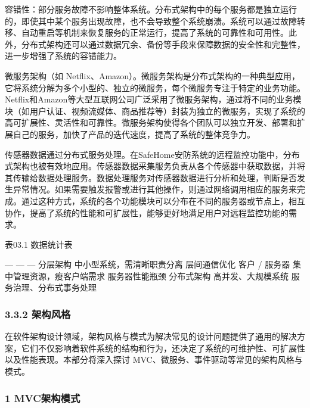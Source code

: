 容错性：部分服务故障不影响整体系统。分布式架构中的每个服务都是独立运行的，即使其中某个服务出现故障，也不会导致整个系统崩溃。系统可以通过故障转移、自动重启等机制来恢复服务的正常运行，提高了系统的可靠性和可用性。此外，分布式架构还可以通过数据冗余、备份等手段来保障数据的安全性和完整性，进一步增强了系统的容错能力。


微服务架构（如 Netflix、Amazon）。微服务架构是分布式架构的一种典型应用，它将系统分解为多个小型的、独立的微服务，每个微服务专注于特定的业务功能。Netflix和Amazon等大型互联网公司广泛采用了微服务架构，通过将不同的业务模块（如用户认证、视频流媒体、商品推荐等）封装为独立的微服务，实现了系统的高可扩展性、灵活性和可靠性。微服务架构使得各个团队可以独立开发、部署和扩展自己的服务，加快了产品的迭代速度，提高了系统的整体竞争力。

传感器数据通过分布式服务处理。在SafeHome安防系统的远程监控功能中，分布式架构也被有效地应用。传感器数据采集服务负责从各个传感器中获取数据，并将其传输给数据处理服务。数据处理服务对传感器数据进行分析和处理，判断是否发生异常情况。如果需要触发报警或进行其他操作，则通过网络调用相应的服务来完成。通过这种方式，系统的各个功能模块可以分布在不同的服务器或节点上，相互协作，提高了系统的性能和可扩展性，能够更好地满足用户对远程监控功能的需求。


表03.1 数据统计表

\textbar---\textbar{} --- \textbar---\textbar{} \textbar{}\textbar{}  \textbar{}\textbar{} \textbar 分层架构\textbar{} 中小型系统，需清晰职责分离 \textbar 层间通信优化\textbar{} \textbar 客户 / 服务器\textbar{} 集中管理资源，瘦客户端需求 \textbar 服务器性能瓶颈\textbar{} \textbar 分布式架构\textbar{} 高并发、大规模系统 \textbar 服务治理、分布式事务处理\textbar{}

\hypertarget{ux67b6ux6784ux98ceux683c}{%
\subsubsection{3.3.2 架构风格}\label{ux67b6ux6784ux98ceux683c}}

在软件架构设计领域，架构风格与模式为解决常见的设计问题提供了通用的解决方案，它们不仅影响着软件系统的结构和行为，还决定了系统的可维护性、可扩展性以及性能表现。本部分将深入探讨 MVC、微服务、事件驱动等常见的架构风格与模式。

\hypertarget{mvcux67b6ux6784ux6a21ux5f0f}{%
\subsubsection{1 MVC架构模式}\label{mvcux67b6ux6784ux6a21ux5f0f}}

